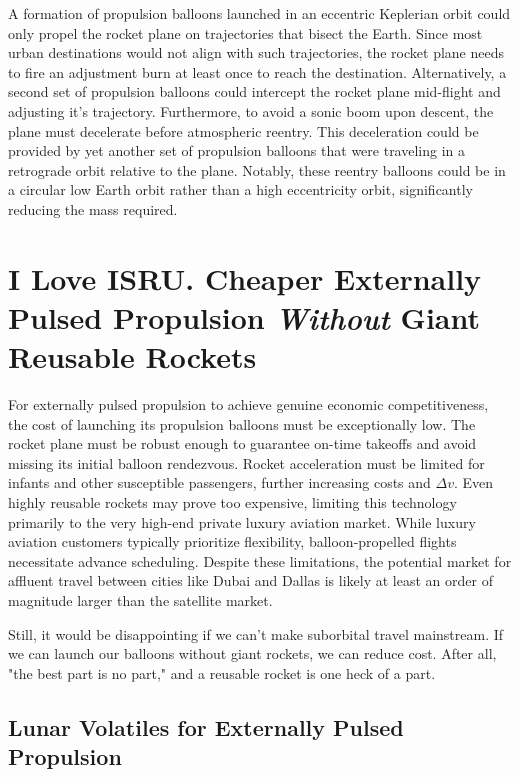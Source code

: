\documentclass{article}
\begin{document}
{A formation of propulsion balloons launched in an eccentric Keplerian orbit could only propel the  rocket plane on trajectories that bisect the Earth. Since most urban destinations would not align with such trajectories, the rocket plane needs to fire an adjustment burn at least once to reach the destination. Alternatively, a second set of propulsion balloons could intercept the rocket plane mid-flight and adjusting it's trajectory. Furthermore, to avoid a sonic boom upon descent, the plane must decelerate before atmospheric reentry. This deceleration could be provided by yet another set of propulsion balloons that were traveling in a retrograde orbit relative to the plane. Notably, these reentry balloons could be in a circular low Earth orbit rather than a high eccentricity orbit, significantly reducing the mass required.

\section{I Love ISRU.  Cheaper Externally Pulsed Propulsion \textit{Without} Giant Reusable Rockets}
For externally pulsed propulsion to achieve genuine economic competitiveness, the cost of launching its propulsion balloons must be exceptionally low.  The rocket plane must be robust enough to guarantee on-time takeoffs and avoid missing its initial balloon rendezvous.  Rocket acceleration must be limited for infants and other susceptible passengers, further increasing costs and $\Delta v$.  Even highly reusable rockets may prove too expensive, limiting this technology primarily to the very high-end private luxury aviation market. While luxury aviation customers typically prioritize flexibility, balloon-propelled flights necessitate advance scheduling.  Despite these limitations, the potential market for affluent travel between cities like Dubai and Dallas is likely at least an order of magnitude larger than the satellite market.

Still, it would be disappointing if we can't make suborbital travel mainstream.   If we can launch our balloons without giant rockets, we can reduce cost.   After all, "the best part is no part," \cite{best_part_no_part} and a reusable rocket is one heck of a part.

\subsection{Lunar Volatiles for Externally Pulsed Propulsion}

}
\end{document}

